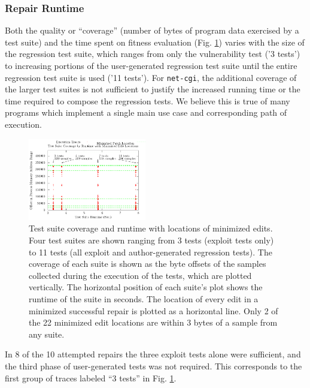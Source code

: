 \documentclass{sigcomm-alternate}
\begin{document}
\subsubsection{Repair Runtime}
\label{runtime}
Both the quality or ``coverage'' (number of bytes of program data
exercised by a test suite) and the time spent on fitness evaluation
(Fig. \ref{ts-cov-rt-w-min}) varies with the size of the regression
test suite, which ranges from only the vulnerability test ('3 tests')
to increasing portions of the user-generated regression test suite
until the entire regression test suite is used ('11 tests').  For
\texttt{net-cgi}, the additional coverage of the larger test suites is
not sufficient to justify the increased running time or the time
required to compose the regression tests.  We believe this is true of
many programs which implement a single main use case and corresponding
path of execution.

\begin{figure}[htb]
  \centering
  \includegraphics[width=0.46\textwidth]{ts-cov-and-runtime-w-min.pdf}  
  \caption{Test suite coverage and runtime with locations of minimized
    edits.  Four test suites are shown ranging from 3 tests (exploit
    tests only) to 11 tests (all exploit and author-generated regression tests).  The
    coverage of each suite is shown as the byte offsets of the samples
    collected during the execution of the tests, which are plotted
    vertically.  The horizontal position of each suite's plot shows
    the runtime of the suite in seconds.  The location of every edit
    in a minimized successful repair is plotted as a horizontal line.
    Only 2 of the 22 minimized edit locations are within 3 bytes of a
    sample from any suite. }
  \label{ts-cov-rt-w-min}
\end{figure}

In 8 of the 10 attempted repairs the three exploit tests alone were
sufficient, and the third phase of user-generated tests was not required.  This corresponds to the first
group of traces labeled ``3 tests'' in Fig. \ref{ts-cov-rt-w-min}.
\end{document}
